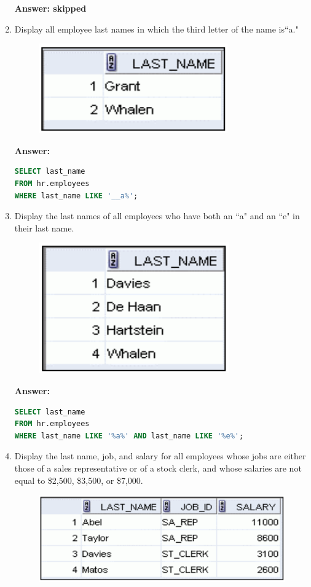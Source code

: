 \documentclass[a4paper,12pt]{article}
\begin{document}
\begin{enumerate}
\textbf{Answer: skipped}
    \item Display all employee last names in which the third letter of the name is``a."
\begin{figure}[h]
    \centering
    \includegraphics*[width=.4\linewidth]{graphics/212.png}
\end{figure}

\textbf{Answer: }
    \begin{lstlisting}[language=SQL, label={lst:employees_data}]
SELECT last_name
FROM hr.employees
WHERE last_name LIKE '__a%';
    \end{lstlisting}
    \item Display the last names of all employees who have both an ``a" and an ``e" in their last name.
\begin{figure}[h]
    \centering
    \includegraphics*[width=.4\linewidth]{graphics/213.png}
\end{figure}

\textbf{Answer: }
    \begin{lstlisting}[language=SQL, label={lst:employees_data}]
SELECT last_name
FROM hr.employees
WHERE last_name LIKE '%a%' AND last_name LIKE '%e%';
    \end{lstlisting}
    \item Display the last name, job, and salary for all employees whose jobs are either those of a sales
representative or of a stock clerk, and whose salaries are not equal to \$2,500, \$3,500, or \$7,000.
\begin{figure}[h]
    \centering
    \includegraphics*[width=.4\linewidth]{graphics/214.png}
\end{figure}


\end{enumerate}
\end{document}
